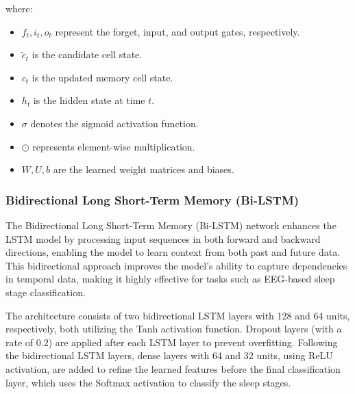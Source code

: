 \noindent where:
\begin{itemize}
	\item \( f_t, i_t, o_t \) represent the forget, input, and output gates, respectively.
	\item \( \tilde{c}_t \) is the candidate cell state.
	\item \( c_t \) is the updated memory cell state.
	\item \( h_t \) is the hidden state at time \( t \).
	\item \( \sigma \) denotes the sigmoid activation function.
	\item \( \odot \) represents element-wise multiplication.
	\item \( W, U, b \) are the learned weight matrices and biases.
\end{itemize}


\subsubsection{Bidirectional Long Short-Term Memory (Bi-LSTM)}

The Bidirectional Long Short-Term Memory (Bi-LSTM) network enhances the LSTM model by processing input sequences in both forward and backward directions, enabling the model to learn context from both past and future data. This bidirectional approach improves the model's ability to capture dependencies in temporal data, making it highly effective for tasks such as EEG-based sleep stage classification.

The architecture consists of two bidirectional LSTM layers with 128 and 64 units, respectively, both utilizing the Tanh activation function. Dropout layers (with a rate of 0.2) are applied after each LSTM layer to prevent overfitting. Following the bidirectional LSTM layers, dense layers with 64 and 32 units, using ReLU activation, are added to refine the learned features before the final classification layer, which uses the Softmax activation to classify the sleep stages.


